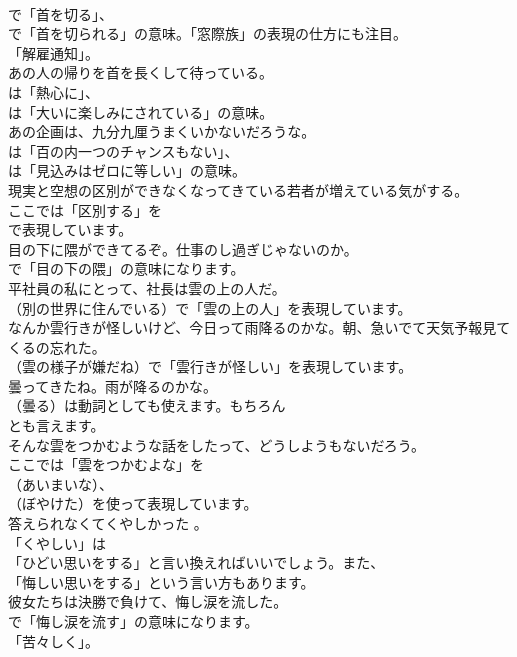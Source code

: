 \documentclass[8pt]{extreport}
\begin{document}
\begin{CJK}{UTF8}{min}
\\	で「首を切る」、
\\	で「首を切られる」の意味。「窓際族」の表現の仕方にも注目。
\\	「解雇通知」。	
\\	あの人の帰りを首を長くして待っている。 
\\	は「熱心に」、
\\	は「大いに楽しみにされている」の意味。	
\\	あの企画は、九分九厘うまくいかないだろうな。 
\\	は「百の内一つのチャンスもない」、
\\	は「見込みはゼロに等しい」の意味。	
\\	現実と空想の区別ができなくなってきている若者が増えている気がする。 
\\	ここでは「区別する」を
\\	で表現しています。	
\\	目の下に隈ができてるぞ。仕事のし過ぎじゃないのか。 
\\	で「目の下の隈」の意味になります。	
\\	平社員の私にとって、社長は雲の上の人だ。 
\\	（別の世界に住んでいる）で「雲の上の人」を表現しています。	
\\	なんか雲行きが怪しいけど、今日って雨降るのかな。朝、急いでて天気予報見てくるの忘れた。 
\\	（雲の様子が嫌だね）で「雲行きが怪しい」を表現しています。	
\\	曇ってきたね。雨が降るのかな。 
\\	（曇る）は動詞としても使えます。もちろん 
\\	とも言えます。	
\\	そんな雲をつかむような話をしたって、どうしようもないだろう。 
\\	ここでは「雲をつかむよな」を
\\	（あいまいな）、
\\	（ぼやけた）を使って表現しています。	
\\	答えられなくてくやしかった 。 
\\	「くやしい」は
\\	「ひどい思いをする」と言い換えればいいでしょう。また、
\\	「悔しい思いをする」という言い方もあります。	
\\	彼女たちは決勝で負けて、悔し涙を流した。 
\\	で「悔し涙を流す」の意味になります。
\\	「苦々しく」。	

\end{CJK}
\end{document}
